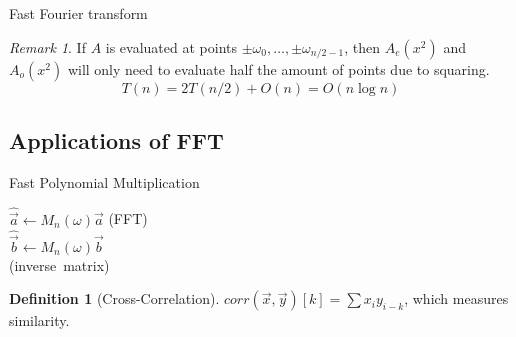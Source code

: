 \documentclass[11pt]{article}
\theoremstyle{definition}
\newtheorem{definition}{Definition}[section]
\theoremstyle{remark}
\newtheorem*{remark}{Remark}
\begin{document}
\begin{algorithm}[ht]
    \caption{Fast Fourier transform}
    
    \DontPrintSemicolon
    
\end{algorithm}
\begin{remark}
If $A$ is evaluated at points $\pm \omega_0,\dots, \pm \omega_{n/2-1}$, then $A_e(x^2)$ and $A_o(x^2)$ will only need to evaluate half the amount of points due to squaring.
$$T(n) = 2T(n/2) + O(n) = O(n \log n)$$
\end{remark}

\subsection{Applications of FFT}
\begin{algorithm}[ht]
    \caption{Fast Polynomial Multiplication}
    
    \DontPrintSemicolon
    
    $\hat{\vec{a}} \gets M_n(\omega)\vec{a}$ \quad \mbox{(FFT)}\\
    $\hat{\vec{b}} \gets M_n(\omega)\vec{b}$\\
     \quad \mbox{(inverse matrix)}
\end{algorithm}

\begin{definition}[Cross-Correlation]
$corr(\vec{x},\vec{y})[k] = \sum x_i y_{i-k}$, which measures similarity.
\end{definition}
\end{document}
